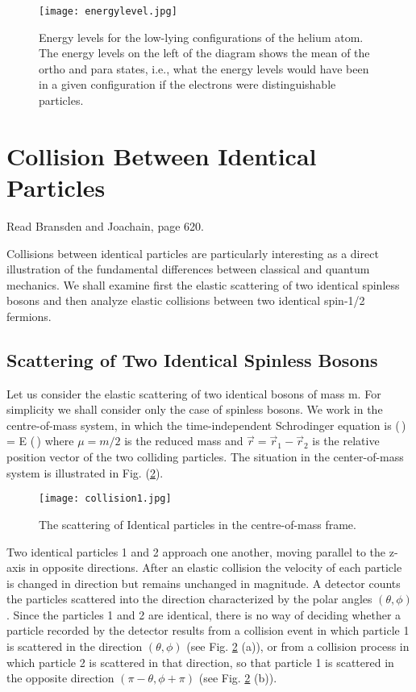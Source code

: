 \begin{figure}[!ht]
	\centering
	\texttt{[image: energylevel.jpg]}
	\caption{ Energy levels for the low-lying configurations of the helium atom. The energy levels on the left
		of the diagram shows the mean of the ortho and para states, i.e., what the energy levels would have been in a given configuration if the electrons were distinguishable particles.}
	\label{fig:energylevel}
\end{figure}

\newpage
\section{Collision Between Identical Particles}
Read Bransden and Joachain, page 620.

Collisions between identical particles are particularly interesting as a direct illustration 
of the fundamental differences between classical and quantum mechanics. We shall 
examine first the elastic scattering of two identical spinless bosons and then analyze 
elastic collisions between two identical spin-1/2 fermions. 

\subsection{Scattering of Two Identical Spinless Bosons}
Let us consider the elastic scattering of two identical bosons of mass m. For simplicity 
we shall consider only the case of spinless bosons. We work in the centre-of-mass 
system, in which the time-independent Schrodinger equation is 
\be
{} \psi(\,) = E \psi(\,) 
\ee
where $\mu =m/2$ is the reduced mass and $\vec{r} = \vec{r}_1 - \vec{r}_2$ is the relative position vector of 
the two colliding particles. The situation in the center-of-mass system is illustrated in 
Fig. (\ref{fig:collision1}). 
\begin{figure}[!ht]
	\centering
	\texttt{[image: collision1.jpg]}
	\caption{ The scattering of Identical particles in the centre-of-mass frame.}
	\label{fig:collision1}
\end{figure}


Two identical particles 1 and 2 approach one another, moving parallel to 
the z-axis in opposite directions. After an elastic collision the velocity of each particle 
is changed in direction but remains unchanged in magnitude. A detector counts the 
particles scattered into the direction characterized by the polar angles $(\theta,\phi)$. Since the 
particles 1 and 2 are identical, there is no way of deciding whether a particle recorded 
by the detector results from a collision event in which particle 1 is scattered in the 
direction $(\theta, \phi)$ (see Fig. \ref{fig:collision1} (a)), or from a collision process in which particle 2 
is scattered in that direction, so that particle 1 is scattered in the opposite direction 
$(\pi-\theta, \phi+\pi)$ (see Fig. \ref{fig:collision1} (b)). 

